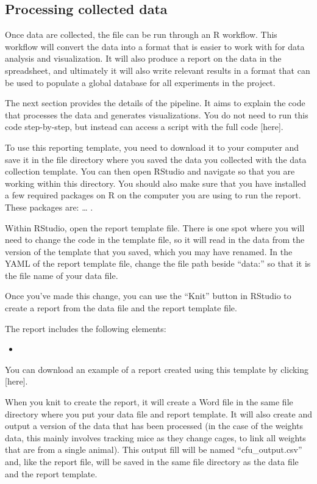 \documentclass[
]{book}
\providecommand{\tightlist}{%
  \setlength{\itemsep}{0pt}\setlength{\parskip}{0pt}}
\begin{document}
\hypertarget{processing-collected-data-1}{%
\subsection{Processing collected data}\label{processing-collected-data-1}}

Once data are collected, the file can be run through an R workflow. This workflow
will convert the data into a format that is easier to work with for data analysis
and visualization. It will also produce a report on the data in the spreadsheet, and
ultimately it will also write relevant results in a format that can be used
to populate a global database for all experiments in the project.

The next section provides the details of the pipeline. It aims to explain the
code that processes the data and generates visualizations. You do not need to
run this code step-by-step, but instead can access a script with the full
code {[}here{]}.

To use this reporting template, you need to download it to your computer and
save it in the file directory where you saved the data you collected with the
data collection template. You can then open RStudio and navigate so that you are
working within this directory. You should also make sure that you have installed
a few required packages on R on the computer you are using to run the report.
These packages are: \ldots{} .

Within RStudio, open the report template file. There is one spot where you will
need to change the code in the template file, so it will read in the data from
the version of the template that you saved, which you may have renamed.
In the YAML of the report template file, change the file path beside ``data:''
so that it is the file name of your data file.

Once you've made this change, you can use the ``Knit'' button in RStudio to
create a report from the data file and the report template file.

The report includes the following elements:

\begin{itemize}
\tightlist
\item
\end{itemize}

You can download an example of a report created using this template by
clicking {[}here{]}.

When you knit to create the report, it will create a Word file in the
same file directory where you put your data file and report template.
It will also create and output a version of the data that has been
processed (in the case of the weights data, this mainly involves
tracking mice as they change cages, to link all weights that are from
a single animal). This output fill will be named ``cfu\_output.csv'' and, like
the report file, will be saved in the same file directory as the
data file and the report template.
\end{document}
